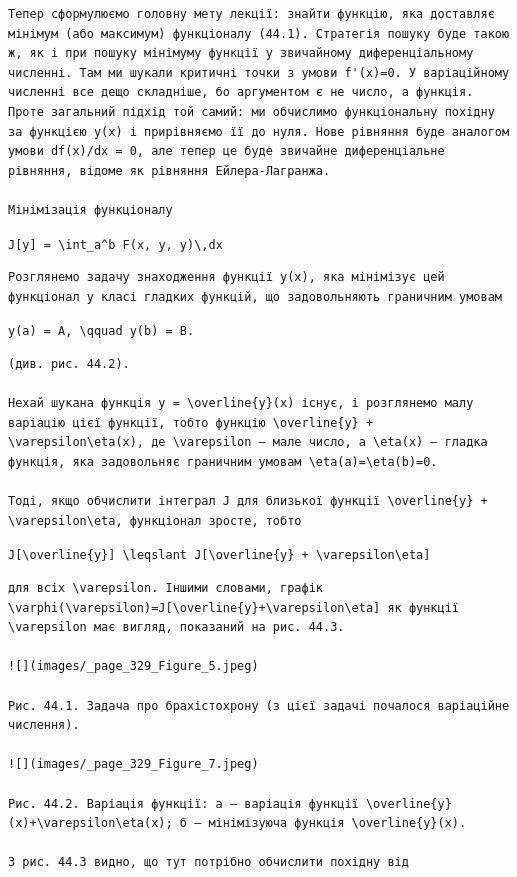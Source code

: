 \documentclass[
  ukrainian,
]{article}
\begin{document}
\begin{verbatim}
Тепер сформулюємо головну мету лекції: знайти функцію, яка доставляє мінімум (або максимум) функціоналу (44.1). Стратегія пошуку буде такою ж, як і при пошуку мінімуму функції у звичайному диференціальному численні. Там ми шукали критичні точки з умови f'(x)=0. У варіаційному численні все дещо складніше, бо аргументом є не число, а функція. Проте загальний підхід той самий: ми обчислимо функціональну похідну за функцією y(x) і прирівняємо її до нуля. Нове рівняння буде аналогом умови df(x)/dx = 0, але тепер це буде звичайне диференціальне рівняння, відоме як рівняння Ейлера-Лагранжа.

Мінімізація функціоналу
\end{verbatim}

\texttt{J{[}y{]}\ =\ \textbackslash{}int\_a\^{}b\ F(x,\ y,\ y\textquotesingle{})\textbackslash{},dx}

\begin{verbatim}
Розглянемо задачу знаходження функції y(x), яка мінімізує цей функціонал у класі гладких функцій, що задовольняють граничним умовам
\end{verbatim}

\texttt{y(a)\ =\ A,\ \textbackslash{}qquad\ y(b)\ =\ B.}

\begin{verbatim}
(див. рис. 44.2).

Нехай шукана функція y = \overline{y}(x) існує, і розглянемо малу варіацію цієї функції, тобто функцію \overline{y} + \varepsilon\eta(x), де \varepsilon — мале число, а \eta(x) — гладка функція, яка задовольняє граничним умовам \eta(a)=\eta(b)=0.

Тоді, якщо обчислити інтеграл J для близької функції \overline{y} + \varepsilon\eta, функціонал зросте, тобто
\end{verbatim}

\texttt{J{[}\textbackslash{}overline\{y\}{]}\ \textbackslash{}leqslant\ J{[}\textbackslash{}overline\{y\}\ +\ \textbackslash{}varepsilon\textbackslash{}eta{]}}

\begin{verbatim}
для всіх \varepsilon. Іншими словами, графік \varphi(\varepsilon)=J[\overline{y}+\varepsilon\eta] як функції \varepsilon має вигляд, показаний на рис. 44.3.

![](images/_page_329_Figure_5.jpeg)

Рис. 44.1. Задача про брахістохрону (з цієї задачі почалося варіаційне числення).

![](images/_page_329_Figure_7.jpeg)

Рис. 44.2. Варіація функції: a — варіація функції \overline{y}(x)+\varepsilon\eta(x); б — мінімізуюча функція \overline{y}(x).

З рис. 44.3 видно, що тут потрібно обчислити похідну від
\end{verbatim}
\end{document}
